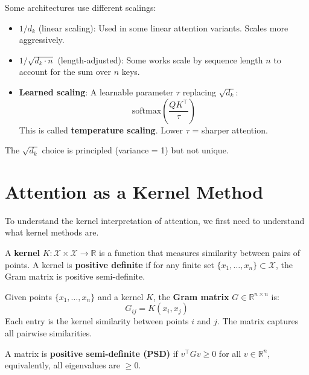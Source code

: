 \begin{remark}
    Some architectures use different scalings:

    \begin{itemize}
        \item \textbf{$1/d_k$} (linear scaling): Used in some linear attention variants. Scales more aggressively.

        \item \textbf{$1/\sqrt{d_k \cdot n}$} (length-adjusted): Some works scale by sequence length $n$ to account for the sum over $n$ keys.

        \item \textbf{Learned scaling}: A learnable parameter $\tau$ replacing $\sqrt{d_k}$:
        \[
            \text{softmax}\left(\frac{QK^\top}{\tau}\right)
        \]
        This is called \textbf{temperature scaling}. Lower $\tau$ = sharper attention.
    \end{itemize}

    The $\sqrt{d_k}$ choice is principled (variance = 1) but not unique.
\end{remark}

\section{Attention as a Kernel Method}

To understand the kernel interpretation of attention, we first need to understand what kernel methods are.

\begin{definition}
    A \textbf{kernel} $K: \mathcal{X} \times \mathcal{X} \to \mathbb{R}$ is a function that measures similarity between pairs of points. A kernel is \textbf{positive definite} if for any finite set $\{x_1, \ldots, x_n\} \subset \mathcal{X}$, the Gram matrix is positive semi-definite.
\end{definition}

\begin{definition}
    Given points $\{x_1, \ldots, x_n\}$ and a kernel $K$, the \textbf{Gram matrix} $G \in \mathbb{R}^{n \times n}$ is:
    \[
        G_{ij} = K(x_i, x_j)
    \]
    Each entry is the kernel similarity between points $i$ and $j$. The matrix captures all pairwise similarities.

    A matrix is \textbf{positive semi-definite (PSD)} if $v^\top G v \geq 0$ for all $v \in \mathbb{R}^n$, equivalently, all eigenvalues are $\geq 0$.
\end{definition}

